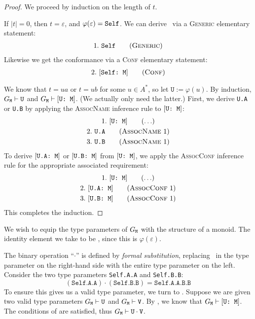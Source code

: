 \documentclass[../generics]{subfiles}
\begin{document}
\begin{proof}
We proceed by induction on the length of $t$.

\BaseCase If $|t|=0$, then $t=\varepsilon$, and $\varphi(\varepsilon)=\texttt{Self}$. We can derive \tSelf\ via a \textsc{Generic} elementary statement:
\begin{gather*}
\GenericStep{Self}{1}
\end{gather*}
Likewise we get the conformance via a \textsc{Conf} elementary statement:
\begin{gather*}
\ConfStep{Self}{M}{2}
\end{gather*}

\InductiveStep We know that $t=ua$ or $t=ub$ for some $u\in A^*$, so let $\texttt{U}:=\varphi(u)$. By induction, $G_\texttt{M}\vdash\texttt{U}$ and $G_\texttt{M}\vdash[\texttt{U:~M}]$. (We actually only need the latter.) First, we derive \texttt{U.A} or \texttt{U.B} by applying the \textsc{AssocName} inference rule to $[\texttt{U:~M}]$:
\begin{gather*}
\AnyStep{\ConfReq{U}{M}}{1}\\
\AssocNameStep{1}{U.A}{2}\\
\AssocNameStep{1}{U.B}{3}
\end{gather*}
To derive $[\texttt{U.A:~M}]$ or $[\texttt{U.B:~M}]$ from $[\texttt{U:~M}]$, we apply the \textsc{AssocConf} inference rule for the appropriate associated requirement:
\begin{gather*}
\AnyStep{\ConfReq{U}{M}}{1}\\
\AssocConfStep{1}{U.A}{M}{2}\\
\AssocConfStep{1}{U.B}{M}{3}
\end{gather*}
This completes the induction.
\end{proof}

We wish to equip the type parameters of $G_\texttt{M}$ with the structure of a monoid. The identity element we take to be \tSelf, since this is $\varphi(\varepsilon)$.

The binary operation ``\;$\cdot$\;'' is defined by \emph{formal substitution}, replacing \tSelf\ in the type parameter on the right-hand side with the entire type parameter on the left. Consider the two type parameters \texttt{Self.A.A} and \texttt{Self.B.B}:
\[(\texttt{Self.A.A})\cdot(\texttt{Self.B.B})=\texttt{Self.A.A.B.B}\]
To ensure this gives us a valid type parameter, we turn to . Suppose we are given two valid type parameters $G_\texttt{M}\vdash\texttt{U}$ and $G_\texttt{M}\vdash\texttt{V}$. By , we know that $G_\texttt{M}\vdash[\texttt{U:~M}]$. The conditions of  are satisfied, thus $G_\texttt{M}\vdash\texttt{U}\cdot\texttt{V}$.
\end{document}

